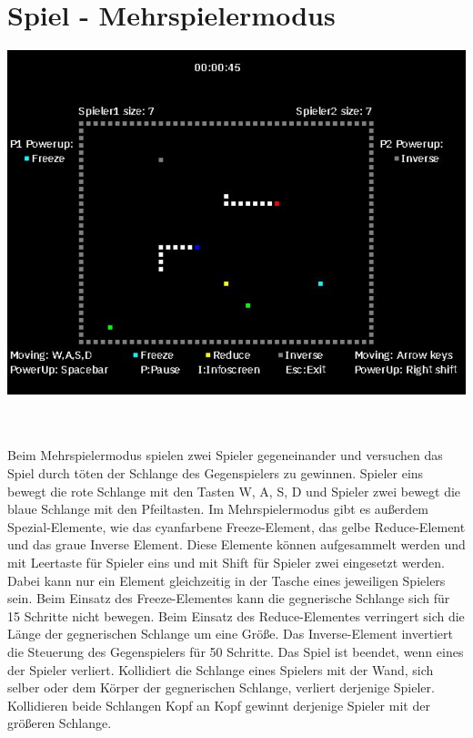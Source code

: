 \section{Spiel - Mehrspielermodus}
\label{Spiel_-_Mehrspielermodus}
%
\begin{minipage}[X]{1.0\textwidth}
 \centering
 \includegraphics[scale=0.5]{bilder/Mehrspielermodus}
 \label{fig:mehrspielermodus}
\end{minipage}
\newline \\ \\
%
	Beim Mehrspielermodus spielen zwei Spieler gegeneinander und versuchen das Spiel durch t{\"o}ten der Schlange des Gegenspielers zu gewinnen. Spieler eins bewegt die rote Schlange mit den Tasten \glqq W\grqq{}, \glqq  A\grqq{}, \glqq S\grqq{}, \glqq D\grqq{} und Spieler zwei bewegt die blaue Schlange mit den Pfeiltasten. Im Mehrspielermodus gibt es au{\ss}erdem Spezial-Elemente, wie das cyanfarbene Freeze-Element, das gelbe Reduce-Element und das graue Inverse Element. Diese Elemente k{\"o}nnen aufgesammelt werden und mit Leertaste f{\"u}r Spieler eins und mit Shift f{\"u}r Spieler zwei eingesetzt werden. Dabei kann nur ein Element gleichzeitig in der Tasche eines jeweiligen Spielers sein. Beim Einsatz des Freeze-Elementes kann die gegnerische Schlange sich f{\"u}r 15 Schritte nicht bewegen. Beim Einsatz des Reduce-Elementes verringert sich die L{\"a}nge der gegnerischen Schlange um eine Gr{\"o}{\ss}e. Das Inverse-Element invertiert die Steuerung des Gegenspielers f{\"u}r 50 Schritte. Das Spiel ist beendet, wenn eines der Spieler verliert. Kollidiert die Schlange eines Spielers mit der Wand, sich selber oder dem K{\"o}rper der gegnerischen Schlange, verliert derjenige Spieler. Kollidieren beide Schlangen Kopf an Kopf gewinnt derjenige Spieler mit der gr{\"o}{\ss}eren Schlange.  
	
